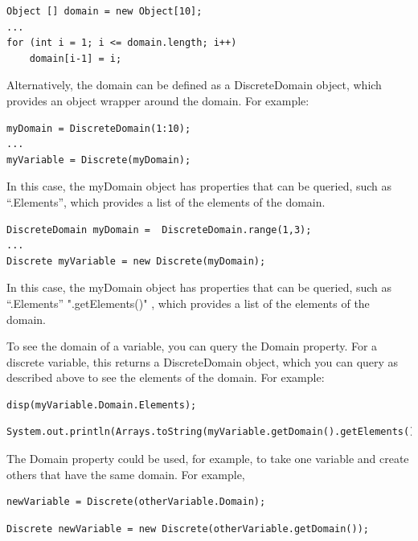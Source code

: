 \ifjava
\begin{lstlisting}
Object [] domain = new Object[10];
...
for (int i = 1; i <= domain.length; i++)
	domain[i-1] = i;
\end{lstlisting}
\fi

Alternatively, the domain can be defined as a DiscreteDomain object, which provides an object wrapper around the domain.  For example:

\ifmatlab
\begin{lstlisting}
myDomain = DiscreteDomain(1:10);
...
myVariable = Discrete(myDomain);
\end{lstlisting}

In this case, the myDomain object has properties that can be queried, such as ``.Elements'', which provides a list of the elements of the domain.

\fi

\ifjava
\begin{lstlisting}
DiscreteDomain myDomain =  DiscreteDomain.range(1,3);
...
Discrete myVariable = new Discrete(myDomain);
\end{lstlisting}


\fi

In this case, the myDomain object has properties that can be queried, such as \ifmatlab ``.Elements'' \fi \ifjava ".getElements()" \fi, which provides a list of the elements of the domain.

To see the domain of a variable, you can query the Domain property.  For a discrete variable, this returns a DiscreteDomain object, which you can query as described above to see the elements of the domain.  For example:

\ifmatlab
\begin{lstlisting}
disp(myVariable.Domain.Elements);
\end{lstlisting}
\fi

\ifjava
\begin{lstlisting}
System.out.println(Arrays.toString(myVariable.getDomain().getElements()));
\end{lstlisting}
\fi

The Domain property could be used, for example, to take one variable and create others that have the same domain.  For example,

\ifmatlab
\begin{lstlisting}
newVariable = Discrete(otherVariable.Domain);
\end{lstlisting}
\fi

\ifjava
\begin{lstlisting}
Discrete newVariable = new Discrete(otherVariable.getDomain());
\end{lstlisting}
\fi


